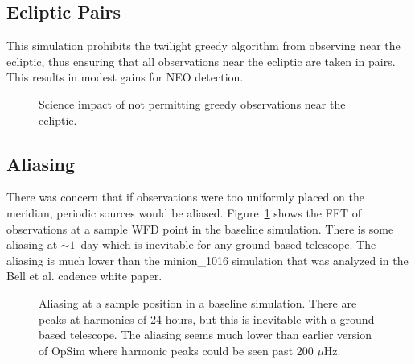 \subsection{Ecliptic Pairs}

This simulation prohibits the twilight greedy algorithm from observing near the ecliptic, thus ensuring that all observations near the ecliptic are taken in pairs. This results in modest gains for NEO detection. 


\begin{figure}
\caption{Science impact of not permitting greedy observations near the ecliptic. }
\end{figure}

\subsection{Aliasing}

There was concern that if observations were too uniformly placed on the meridian, periodic sources would be aliased. Figure~\ref{fig:alias} shows the FFT of observations at a sample WFD point in the baseline simulation. There is some aliasing at $\sim1$\ day which is inevitable for any ground-based telescope.  The aliasing is much lower than the minion\_1016 simulation that was analyzed in the Bell et al. cadence white paper. 

\begin{figure}
\label{fig:alias}
\caption{Aliasing at a sample position in a baseline simulation. There are peaks at harmonics of 24 hours, but this is inevitable with a ground-based telescope. The aliasing seems much lower than earlier version of OpSim where harmonic peaks could be seen past 200 $\mu$Hz.}
\end{figure}
